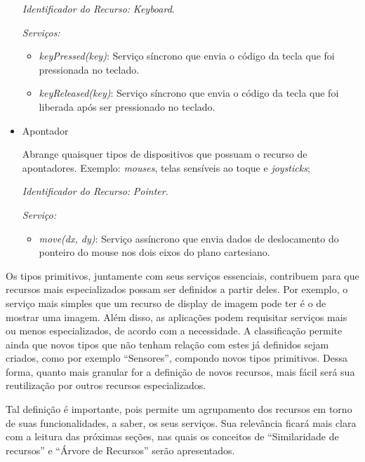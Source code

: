 \begin{itemize}
		\emph{Identificador do Recurso:} \emph{Keyboard}.

		\emph{Serviços:}
		\begin{itemize}
			\item \emph{keyPressed(key)}: Serviço síncrono que envia o código da tecla que foi pressionada no teclado.

			\item \emph{keyReleased(key)}: Serviço síncrono que envia o código da tecla que foi liberada após ser pressionado no teclado.
		\end{itemize}

	\item Apontador
		
		Abrange quaisquer tipos de dispositivos que possuam o recurso de apontadores. Exemplo: \emph{mouses}, telas sensíveis ao toque e \emph{joysticks};

		\emph{Identificador do Recurso:} \emph{Pointer}.

		\emph{Serviço:}
		\begin{itemize}
			\item \emph{move(dx, dy)}: Serviço assíncrono que envia dados de deslocamento do ponteiro do mouse nos dois eixos do plano cartesiano.
		\end{itemize}

\end{itemize}

Os tipos primitivos, juntamente com seus serviços essenciais, contribuem para que recursos mais especializados possam ser definidos a partir deles. Por exemplo, o serviço mais simples que um recurso de display de imagem pode ter é o de mostrar uma imagem. Além disso, as aplicações podem requisitar serviços mais ou menos especializados, de acordo com a necessidade. A classificação permite ainda que novos tipos que não tenham relação com estes já definidos sejam criados, como por exemplo ``Sensores'', compondo novos tipos primitivos. Dessa forma, quanto mais granular for a definição de novos recursos, mais fácil será sua reutilização por outros recursos especializados. 

Tal definição é importante, pois permite um agrupamento dos recursos em torno de suas funcionalidades, a saber, os seus serviços. Sua relevância ficará mais clara com a leitura das próximas seções, nas quais os conceitos de ``Similaridade de recursos'' e ``Árvore de Recursos'' serão apresentados.




